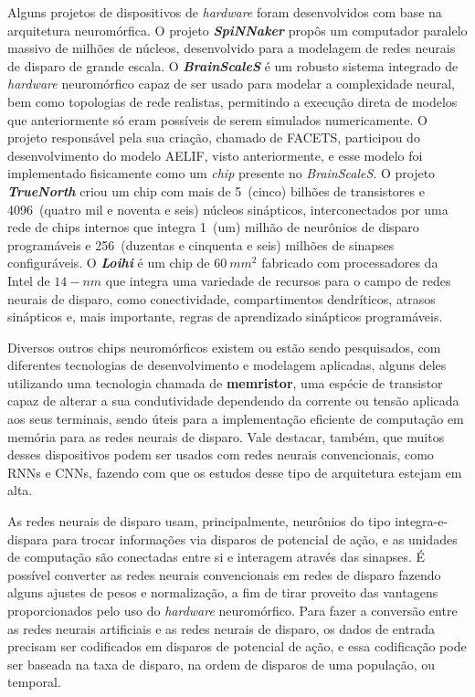 Alguns projetos de dispositivos de \textit{hardware} foram desenvolvidos com base na arquitetura neuromórfica. O projeto \textbf{\textit{SpiNNaker}} propôs um computador paralelo massivo de milhões de núcleos, desenvolvido para a modelagem de redes neurais de disparo de grande escala.
O \textbf{\textit{BrainScaleS}} é um robusto sistema integrado de \textit{hardware} neuromórfico capaz de ser usado para modelar a complexidade neural, bem como topologias de rede realistas, permitindo a execução direta de modelos que anteriormente só eram possíveis de serem simulados numericamente.
O projeto responsável pela sua criação, chamado de FACETS, participou do desenvolvimento do modelo AELIF, visto anteriormente, e esse modelo foi implementado fisicamente como um \textit{chip} presente no \textit{BrainScaleS}.
O projeto \textbf{\textit{TrueNorth}} criou um chip com mais de 5~(cinco) bilhões de transistores e 4096~(quatro mil e noventa e seis) núcleos sinápticos, interconectados por uma rede de chips internos que integra 1~(um) milhão de neurônios de disparo programáveis e 256~(duzentas e cinquenta e seis) milhões de sinapses configuráveis.
O \textbf{\textit{Loihi}} é um chip de $60\ mm^2$ fabricado com processadores da Intel de $14-nm$ que integra uma variedade de recursos para o campo de redes neurais de disparo, como conectividade, compartimentos dendríticos, atrasos sinápticos e, mais importante, regras de aprendizado sinápticos programáveis.

Diversos outros chips neuromórficos existem ou estão sendo pesquisados, com diferentes tecnologias de desenvolvimento e modelagem aplicadas,
alguns deles utilizando uma tecnologia chamada de \textbf{memristor}, uma espécie de transistor capaz de alterar a sua condutividade dependendo da corrente ou tensão aplicada aos seus terminais, sendo úteis para a implementação eficiente de computação em memória para as redes neurais de disparo.
Vale destacar, também, que muitos desses dispositivos podem ser usados com redes neurais convencionais, como RNNs e CNNs, fazendo com que os estudos desse tipo de arquitetura estejam em alta.

As redes neurais de disparo usam, principalmente, neurônios do tipo integra-e-dispara para trocar informações via disparos de potencial de ação, e as unidades de computação são conectadas entre si e interagem através das sinapses.
É possível converter as redes neurais convencionais em redes de disparo fazendo alguns ajustes de pesos e normalização, a fim de tirar proveito das vantagens proporcionados pelo uso do \textit{hardware} neuromórfico.
Para fazer a conversão entre as redes neurais artificiais e as redes neurais de disparo, os dados de entrada precisam ser codificados em disparos de potencial de ação, e essa codificação pode ser baseada na taxa de disparo, na ordem de disparos de uma população, ou temporal.


